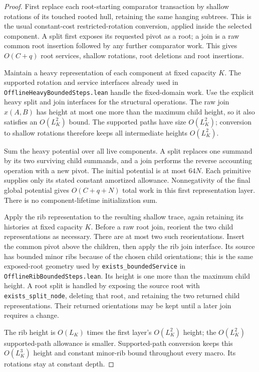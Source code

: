 \documentclass[11pt]{article}
\numberwithin{equation}{section}
\begin{document}
\begin{proof}
First replace each root-starting comparator transaction by shallow
rotations of its touched rooted hull, retaining the same hanging
subtrees. This is the usual constant-cost restricted-rotation conversion,
applied inside the selected component. A split first exposes its
requested pivot as a root; a join is a raw common root insertion followed
by any further comparator work. This gives $O(C+q)$ root services,
shallow rotations, root deletions and root insertions.

Maintain a heavy representation of each component at fixed capacity
$K$. The supported rotation and service interfaces already used in
\texttt{OfflineHeavyBoundedSteps.lean} handle the fixed-domain work.
Use the explicit heavy split and join interfaces for the structural
operations. The raw join $x(A,B)$ has height at most one more than the
maximum child height, so it also satisfies an $O(L_K^2)$ bound.
The supported paths have size $O(L_K^2)$; conversion to shallow rotations
therefore keeps all intermediate heights $O(L_K^2)$.

Sum the heavy potential over all live components. A split replaces one
summand by its two surviving child summands, and a join performs the
reverse accounting operation with a new pivot. The initial potential is
at most $64N$. Each primitive supplies only its stated constant
amortized allowance. Nonnegativity of the final global potential gives
$O(C+q+N)$ total work in this first representation layer. There is no
component-lifetime initialization sum.

Apply the rib representation to the resulting shallow trace, again
retaining its histories at fixed capacity $K$. Before a raw root join,
reorient the two child representations as necessary. There are at most
two such reorientations. Insert the common pivot above the children,
then apply the rib join interface. Its source has bounded minor ribs
because of the chosen child orientations; this is the same exposed-root
geometry used by \texttt{exists\_boundedService} in
\texttt{OfflineRibBoundedSteps.lean}. Its height is one more than the
maximum child height. A root split is handled by exposing the source
root with \texttt{exists\_split\_node}, deleting that root, and retaining
the two returned child representations. Their returned orientations may
be kept until a later join requires a change.

The rib height is $O(L_K)$ times the first layer's $O(L_K^2)$ height;
the $O(L_K^2)$ supported-path allowance is smaller. Supported-path
conversion keeps this $O(L_K^3)$ height and constant minor-rib bound
throughout every macro. Its rotations stay at constant depth.


\end{proof}
\end{document}
